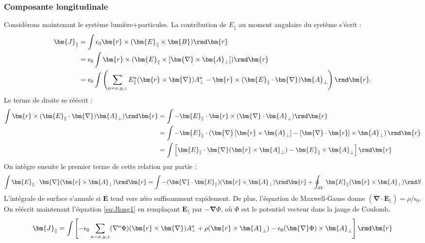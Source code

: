 \subsubsection{Composante longitudinale}
Considérons maintenant le système {lumière+particules}. La contribution de $E_{\parallel}$ au moment angulaire du système s'écrit : 
\begin{align}
\bm{J}_{\parallel}&=\int{\epsilon_0\bm{r}\times(\bm{E}_{\parallel}\times\bm{B})\rmd\bm{r}}\nonumber\\
&=\epsilon_0\int{\bm{r}\times(\bm{E}_{\parallel}\times\left[\bm{\nabla}\times\bm{A}_{\bot}\right])\rmd\bm{r}}\nonumber\\
&=\epsilon_0\int{\left(\sum_{a=x,y,z} E^a_{\parallel}(\bm{r}\times\bm{\nabla})A^a_{\bot}-\bm{r}\times(\bm{E}_{\parallel}\cdot\bm{\nabla})\bm{A}_{\bot}\right)\rmd\bm{r}}.
\label{eq:Jlong1}
\end{align}
Le terme de droite se réécrit :
\begin{align*}
\int{\bm{r}\times(\bm{E}_{\parallel}\cdot\bm{\nabla})\bm{A}_{\bot})\rmd\bm{r}}&=
\int{-\bm{E}_{\parallel}\cdot\bm{r}\times(\bm{\nabla}\cdot\bm{A}_{\bot})\rmd\bm{r}}\nonumber\\
&=\int{-\bm{E}_{\parallel}\cdot\left(\bm{\nabla}\left[\bm{r}\times\bm{A}_{\bot}\right]-\left[\bm{\nabla}\cdot\bm{r}\right]\times\bm{A}_{\bot}\right)\rmd\bm{r}}\nonumber\\
&=\int{\left[\bm{E}_{\parallel}\cdot\bm{\nabla}(\bm{r}\times\bm{A}_{\bot})-\bm{E}_{\parallel}\times\bm{A}_{\bot}\right]\rmd\bm{r}}
\end{align*}
On intègre ensuite le premier terme de cette relation par partie :
\begin{equation*}
\int{\bm{E}_{\parallel}\cdot\bm{\nabla}(\bm{r}\times\bm{A}_{\bot})\rmd\bm{r}}=
\int{-(\bm{\nabla}\cdot\bm{E}_{\parallel})(\bm{r}\times\bm{A}_{\bot})\rmd\bm{r}}+\oint_{\partial V}{\bm{E}_{\parallel}(\bm{r}\times\bm{A}_{\bot})\rmd S}
\label{eq:Jlong5}
\end{equation*}
L'intégrale de surface s'annule si $\bm{E}$ tend vers zéro suffisamment rapidement. De plus, l'équation de Maxwell-Gauss donne 
$(\bm{\nabla}\cdot\bm{E}_{\parallel}) = \rho/\epsilon_0$. On réécrit maintenant l'équation \ref{eq:Jlong1} en remplaçant $\bm{E}_{\parallel}$ par $-\bm{\nabla}\Phi$, où $\Phi$ est le potentiel vecteur dans la jauge de Coulomb.
\begin{equation}
\bm{J}_{\parallel}=\int{\left[-\epsilon_0\sum_{a=x,y,z}(\nabla^a\Phi)(\bm{r}\times\bm{\nabla})A^a_{\bot}
+\rho(\bm{r}\times\bm{A}_{\bot})
-\epsilon_0(\bm{\nabla}\Phi)\times\bm{A}_{\bot}
\right]\rmd\bm{r}}
\label{eq:Jlong2}
\end{equation}
